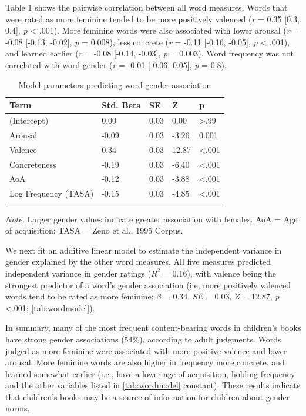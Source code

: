\documentclass[english,,man,floatsintext]{apa6}
\begin{document}
Table 1 shows the pairwise correlation between all word measures. Words that were rated as more feminine tended to be more positively valenced (\emph{r} = 0.35 {[}0.3, 0.4{]}, \emph{p} \textless{} .001). More feminine words were also associated with lower arousal (\emph{r} = -0.08 {[}-0.13, -0.02{]}, \emph{p} = 0.008), less concrete (\emph{r} = -0.11 {[}-0.16, -0.05{]}, \emph{p} \textless{} .001), and learned earlier (\emph{r} = -0.08 {[}-0.14, -0.03{]}, \emph{p} = 0.003). Word frequency was not correlated with word gender (\emph{r} = -0.01 {[}-0.06, 0.05{]}, \emph{p} = 0.8).

\begin{table}[tbp]
\begin{center}
\begin{threeparttable}
\caption{\label{tab:wordmodel}Model parameters predicting word gender association}
\begin{tabular}{lllll}
\toprule
Term & Std. Beta & SE & Z & p\\
\midrule
(Intercept) & 0.00 & 0.03 & 0.00 & >.99\\
Arousal & -0.09 & 0.03 & -3.26 & 0.001\\
Valence & 0.34 & 0.03 & 12.87 & <.001\\
Concreteness & -0.19 & 0.03 & -6.40 & <.001\\
AoA & -0.12 & 0.03 & -3.88 & <.001\\
Log Frequency (TASA) & -0.15 & 0.03 & -4.85 & <.001\\
\bottomrule
\addlinespace
\end{tabular}
\begin{tablenotes}[para]
\normalsize{\textit{Note.} Larger gender values indicate greater association with females. AoA = Age of acquisition;  TASA = Zeno et al., 1995 Corpus.}
\end{tablenotes}
\end{threeparttable}
\end{center}
\end{table}

We next fit an additive linear model to estimate the independent variance in gender explained by the other word measures. All five measures predicted independent variance in gender ratings (\(R^2\) = 0.16), with valence being the strongest predictor of a word's gender association (i.e, more positively valenced words tend to be rated as more feminine; \(\beta\) = 0.34, \emph{SE} = 0.03, \emph{Z} = 12.87, \emph{p} \textless.001; \autoref{tab:wordmodel}).

In summary, many of the most frequent content-bearing words in children's books have strong gender associations (54\%), according to adult judgments. Words judged as more feminine were associated with more positive valence and lower arousal. More feminine words are also higher in frequency more concrete, and learned somewhat earlier (i.e., have a lower age of acquisition, holding frequency and the other variables listed in \autoref{tab:wordmodel} constant). These results indicate that children's books may be a source of information for children about gender norms.
\end{document}
